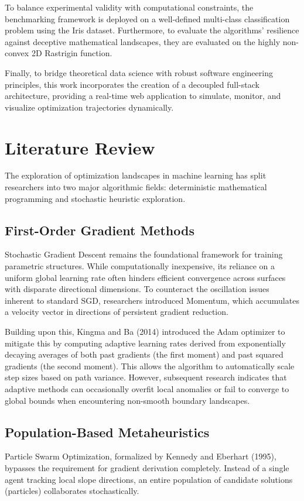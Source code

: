 \documentclass[12pt, a4paper]{article}
\begin{document}
To balance experimental validity with computational constraints, the benchmarking framework is deployed on a well-defined multi-class classification problem using the Iris dataset. Furthermore, to evaluate the algorithms' resilience against deceptive mathematical landscapes, they are evaluated on the highly non-convex 2D Rastrigin function. 

Finally, to bridge theoretical data science with robust software engineering principles, this work incorporates the creation of a decoupled full-stack architecture, providing a real-time web application to simulate, monitor, and visualize optimization trajectories dynamically.

\section{Literature Review}

The exploration of optimization landscapes in machine learning has split researchers into two major algorithmic fields: deterministic mathematical programming and stochastic heuristic exploration.

\subsection{First-Order Gradient Methods}
Stochastic Gradient Descent remains the foundational framework for training parametric structures. While computationally inexpensive, its reliance on a uniform global learning rate often hinders efficient convergence across surfaces with disparate directional dimensions. To counteract the oscillation issues inherent to standard SGD, researchers introduced Momentum, which accumulates a velocity vector in directions of persistent gradient reduction.

Building upon this, Kingma and Ba (2014) introduced the Adam optimizer to mitigate this by computing adaptive learning rates derived from exponentially decaying averages of both past gradients (the first moment) and past squared gradients (the second moment). This allows the algorithm to automatically scale step sizes based on path variance. However, subsequent research indicates that adaptive methods can occasionally overfit local anomalies or fail to converge to global bounds when encountering non-smooth boundary landscapes.

\subsection{Population-Based Metaheuristics}
Particle Swarm Optimization, formalized by Kennedy and Eberhart (1995), bypasses the requirement for gradient derivation completely. Instead of a single agent tracking local slope directions, an entire population of candidate solutions (particles) collaborates stochastically. 
\end{document}
